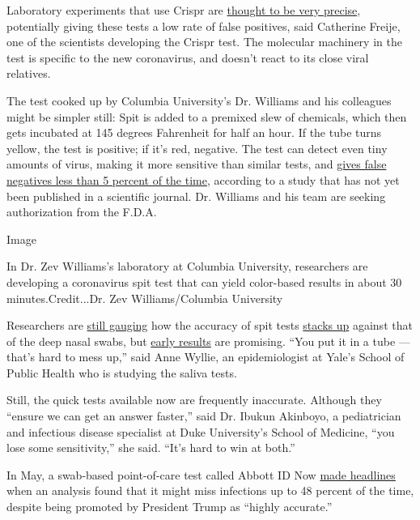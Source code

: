 Laboratory experiments that use Crispr are
\href{https://www.ncbi.nlm.nih.gov/pmc/articles/PMC5915479/}{thought to
be very precise}, potentially giving these tests a low rate of false
positives, said Catherine Freije, one of the scientists developing the
Crispr test. The molecular machinery in the test is specific to the new
coronavirus, and doesn't react to its close viral relatives.

The test cooked up by Columbia University's Dr. Williams and his
colleagues might be simpler still: Spit is added to a premixed slew of
chemicals, which then gets incubated at 145 degrees Fahrenheit for half
an hour. If the tube turns yellow, the test is positive; if it's red,
negative. The test can detect even tiny amounts of virus, making it more
sensitive than similar tests, and
\href{https://www.medrxiv.org/content/10.1101/2020.06.13.20129841v1.full.pdf}{gives
false negatives less than 5 percent of the time}, according to a study
that has not yet been published in a scientific journal. Dr. Williams
and his team are seeking authorization from the F.D.A.

Image

In Dr. Zev Williams's laboratory at Columbia University, researchers are
developing a coronavirus spit test that can yield color-based results in
about 30 minutes.Credit...Dr. Zev Williams/Columbia University

Researchers are
\href{https://jamanetwork.com/journals/jama/fullarticle/2765837}{still
gauging} how the accuracy of spit tests
\href{https://pubmed.ncbi.nlm.nih.gov/32310815/}{stacks up} against that
of the deep nasal swabs, but
\href{https://www.medrxiv.org/content/10.1101/2020.04.16.20067835v1.full.pdf}{early
results} are promising. ``You put it in a tube --- that's hard to mess
up,'' said Anne Wyllie, an epidemiologist at Yale's School of Public
Health who is studying the saliva tests.

Still, the quick tests available now are frequently inaccurate. Although
they ``ensure we can get an answer faster,'' said Dr. Ibukun Akinboyo, a
pediatrician and infectious disease specialist at Duke University's
School of Medicine, ``you lose some sensitivity,'' she said. ``It's hard
to win at both.''

In May, a swab-based point-of-care test called Abbott ID Now
\href{https://www.nytimes3xbfgragh.onion/interactive/2020/05/12/us/coronavirus-testing-white-house.html}{made
headlines} when an analysis found that it might miss infections up to 48
percent of the time, despite being promoted by President Trump as
``highly accurate.''

